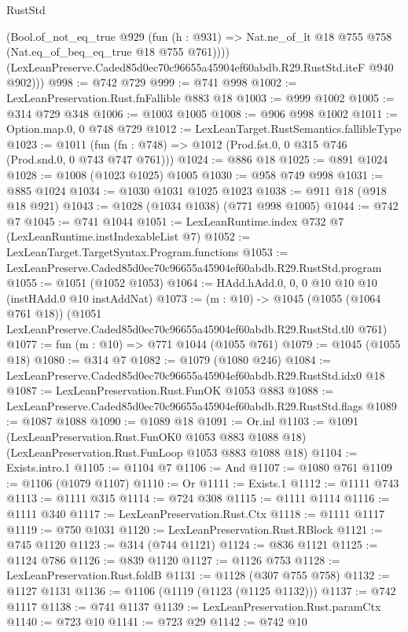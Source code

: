 \begin{lexlean}{RustStd}
\begin{coremodule}
          (Bool.of_not_eq_true
            @929
            (fun (h : @931) => Nat.ne_of_lt @18 @755 @758 (Nat.eq_of_beq_eq_true @18 @755 @761))))
        (LexLeanPreserve.Caded85d0ec70c96655a45904ef60abdb.R29.RustStd.iteF @940 @902)))
@998 := @742 @729
@999 := @741 @998
@1002 := LexLeanPreservation.Rust.fnFallible @883 @18
@1003 := @999 @1002
@1005 := @314 @729 @348
@1006 := @1003 @1005
@1008 := @906 @998 @1002
@1011 := Option.map.{0, 0} @748 @729
@1012 := LexLeanTarget.RustSemantics.fallibleType
@1023 := @1011
    (fun (fn : @748) => @1012 (Prod.fst.{0, 0} @315 @746 (Prod.snd.{0, 0} @743 @747 @761)))
@1024 := @886 @18
@1025 := @891 @1024
@1028 := @1008 (@1023 @1025) @1005
@1030 := @958 @749 @998
@1031 := @885 @1024
@1034 := @1030 @1031 @1025 @1023
@1038 := @911 @18 (@918 @18 @921)
@1043 := @1028 (@1034 @1038) (@771 @998 @1005)
@1044 := @742 @7
@1045 := @741 @1044
@1051 := LexLeanRuntime.index @732 @7 (LexLeanRuntime.instIndexableList @7)
@1052 := LexLeanTarget.TargetSyntax.Program.functions
@1053 := LexLeanPreserve.Caded85d0ec70c96655a45904ef60abdb.R29.RustStd.program
@1055 := @1051 (@1052 @1053)
@1064 := HAdd.hAdd.{0, 0, 0} @10 @10 @10 (instHAdd.{0} @10 instAddNat)
@1073 := (m : @10) ->
  @1045
    (@1055 (@1064 @761 @18))
    (@1051 LexLeanPreserve.Caded85d0ec70c96655a45904ef60abdb.R29.RustStd.tl0 @761)
@1077 := fun (m : @10) => @771 @1044 (@1055 @761)
@1079 := @1045 (@1055 @18)
@1080 := @314 @7
@1082 := @1079 (@1080 @246)
@1084 := LexLeanPreserve.Caded85d0ec70c96655a45904ef60abdb.R29.RustStd.idx0 @18
@1087 := LexLeanPreservation.Rust.FunOK @1053 @883
@1088 := LexLeanPreserve.Caded85d0ec70c96655a45904ef60abdb.R29.RustStd.flags
@1089 := @1087 @1088
@1090 := @1089 @18
@1091 := Or.inl
@1103 := @1091
    (LexLeanPreservation.Rust.FunOK0 @1053 @883 @1088 @18)
    (LexLeanPreservation.Rust.FunLoop @1053 @883 @1088 @18)
@1104 := Exists.intro.{1}
@1105 := @1104 @7
@1106 := And
@1107 := @1080 @761
@1109 := @1106 (@1079 @1107)
@1110 := Or
@1111 := Exists.{1}
@1112 := @1111 @743
@1113 := @1111 @315
@1114 := @724 @308
@1115 := @1111 @1114
@1116 := @1111 @340
@1117 := LexLeanPreservation.Rust.Ctx
@1118 := @1111 @1117
@1119 := @750 @1031
@1120 := LexLeanPreservation.Rust.RBlock
@1121 := @745 @1120
@1123 := @314 (@744 @1121)
@1124 := @836 @1121
@1125 := @1124 @786
@1126 := @839 @1120
@1127 := @1126 @753
@1128 := LexLeanPreservation.Rust.foldB
@1131 := @1128 (@307 @755 @758)
@1132 := @1127 @1131
@1136 := @1106 (@1119 (@1123 (@1125 @1132)))
@1137 := @742 @1117
@1138 := @741 @1137
@1139 := LexLeanPreservation.Rust.paramCtx
@1140 := @723 @10
@1141 := @723 @29
@1142 := @742 @10

\end{coremodule}
\end{lexlean}
